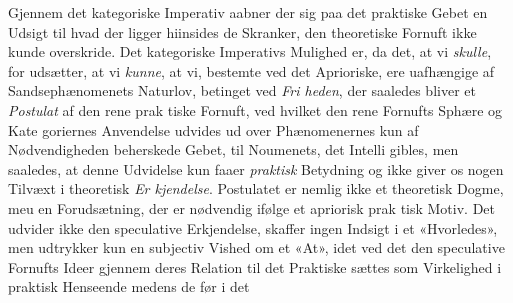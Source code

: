 \documentclass[12pt,a4paper]{book}
\begin{document}
Gjennem det kategoriske Imperativ aabner der sig paa
det praktiske Gebet en Udsigt til hvad der ligger hiinsides de
Skranker, den theoretiske Fornuft ikke kunde overskride. Det
kategoriske Imperativs Mulighed er, da det, at vi \emph{skulle}, for\-%
udsætter, at vi \emph{kunne}, at vi, bestemte ved det Aprioriske, ere
uafhængige af Sandsephænomenets Naturlov, betinget ved \emph{Fri\-%
heden}, der saaledes bliver et \emph{Postulat} af den rene prak\-%
tiske Fornuft, ved hvilket den rene Fornufts Sphære og Kate\-%
goriernes Anvendelse udvides ud over Phænomenernes kun af
Nødvendigheden beherskede Gebet, til Noumenets, det Intelli\-%
gibles, men saaledes, at denne Udvidelse kun faaer \emph{praktisk}
Betydning og ikke giver os nogen Tilvæxt i theoretisk \emph{Er\-%
kjendelse}. Postulatet er nemlig ikke et theoretisk Dogme,
meu en Forudsætning, der er nødvendig ifølge et apriorisk prak\-%
tisk Motiv. Det udvider ikke den speculative Erkjendelse,
skaffer ingen Indsigt i et «Hvorledes», men udtrykker kun en
subjectiv Vished om et «At», idet ved det den speculative
Fornufts Ideer gjennem deres Relation til det Praktiske sættes
som Virkelighed i praktisk Henseende medens de før i det
\end{document}
